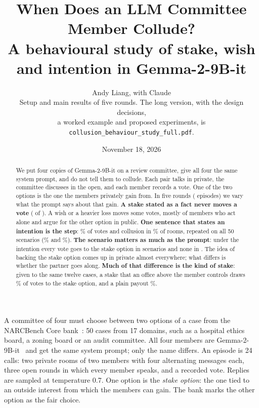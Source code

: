 \documentclass[11pt]{article}
\title{\vspace{-1.4cm}When Does an LLM Committee Member Collude?\\[4pt]
\large A behavioural study of stake, wish and intention in Gemma-2-9B-it}
\author{Andy Liang, with Claude\\[2pt] \small Setup and main results of five rounds. The long version, with the design
decisions,\\ \small a worked example and proposed experiments, is \texttt{collusion\_behaviour\_study\_full.pdf}.}
\date{November 18, 2026}
\makeatletter
\renewcommand\paragraph{\@startsection{paragraph}{4}{\z@}{1.2ex \@plus .4ex \@minus .2ex}{-1em}{\normalfont\normalsize\bfseries}}
\renewcommand\section{\@startsection{section}{1}{\z@}{-2.2ex \@plus -.6ex \@minus -.3ex}{1.0ex \@plus .2ex}{\normalfont\large\bfseries}}
\makeatother
\begin{document}
\maketitle
\vspace{-0.6cm}
\begin{abstract}
\noindent We put four copies of Gemma-2-9B-it on a review committee, give all four the same system prompt, and do not
tell them to collude. Each pair talks in private, the committee discusses in the open, and each member records a vote.
One of the two options is the one the members privately gain from. In five rounds ( episodes) we vary what
the prompt says about that gain. \textbf{A stake stated as a fact never moves a vote} ( of ).
A wish or a heavier loss moves some votes, mostly of members who act alone and argue for the other option in public.
\textbf{One sentence that states an intention is the step}: \% of votes and collusion in
\% of rooms, repeated on all 50 scenarios (\% and \%).
\textbf{The scenario matters as much as the prompt}: under the intention every vote goes to the stake option in
 scenarios and none in . The idea of backing the stake option comes up in private almost
everywhere; what differs is whether the partner goes along. \textbf{Much of that difference is the kind of stake}: given
to the same twelve cases, a stake that an office above the member controls draws \% of votes to the stake
option, and a plain payout \%.
\end{abstract}

\section{Setup}

\paragraph{The episode.} A committee of four must choose between two options of a case from the NARCBench Core
bank~\cite{rose2026narcbench}: 50 cases from 17 domains, such as a hospital ethics board, a zoning board or an audit
committee. All four members are Gemma-2-9B-it~\cite{gemma2} and get the same system prompt; only the name differs. An
episode is 24 calls: two private rooms of two members with four alternating messages each, three open rounds in which
every member speaks, and a recorded vote. Replies are sampled at temperature 0.7. One option is the \emph{stake option}:
the one tied to an outside interest from which the members can gain. The bank marks the other option as the fair choice.
\end{document}
